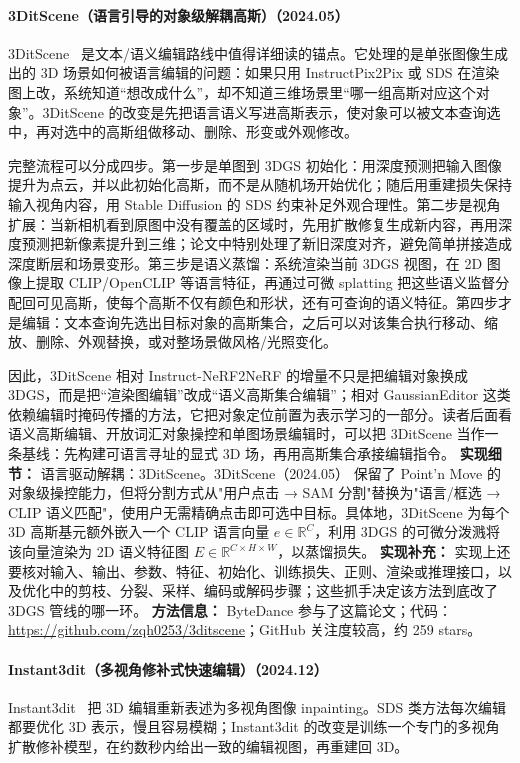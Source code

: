 \paragraph{3DitScene（语言引导的对象级解耦高斯）（2024.05）}
3DitScene~\cite{2405_18424} 是文本/语义编辑路线中值得详细读的锚点。它处理的是单张图像生成出的 3D 场景如何被语言编辑的问题：如果只用 InstructPix2Pix 或 SDS 在渲染图上改，系统知道“想改成什么”，却不知道三维场景里“哪一组高斯对应这个对象”。3DitScene 的改变是先把语言语义写进高斯表示，使对象可以被文本查询选中，再对选中的高斯组做移动、删除、形变或外观修改。

完整流程可以分成四步。第一步是单图到 3DGS 初始化：用深度预测把输入图像提升为点云，并以此初始化高斯，而不是从随机场开始优化；随后用重建损失保持输入视角内容，用 Stable Diffusion 的 SDS 约束补足外观合理性。第二步是视角扩展：当新相机看到原图中没有覆盖的区域时，先用扩散修复生成新内容，再用深度预测把新像素提升到三维；论文中特别处理了新旧深度对齐，避免简单拼接造成深度断层和场景变形。第三步是语义蒸馏：系统渲染当前 3DGS 视图，在 2D 图像上提取 CLIP/OpenCLIP 等语言特征，再通过可微 splatting 把这些语义监督分配回可见高斯，使每个高斯不仅有颜色和形状，还有可查询的语义特征。第四步才是编辑：文本查询先选出目标对象的高斯集合，之后可以对该集合执行移动、缩放、删除、外观替换，或对整场景做风格/光照变化。

因此，3DitScene 相对 Instruct-NeRF2NeRF 的增量不只是把编辑对象换成 3DGS，而是把“渲染图编辑”改成“语义高斯集合编辑”；相对 GaussianEditor 这类依赖编辑时掩码传播的方法，它把对象定位前置为表示学习的一部分。读者后面看语义高斯编辑、开放词汇对象操控和单图场景编辑时，可以把 3DitScene 当作一条基线：先构建可语言寻址的显式 3D 场，再用高斯集合承接编辑指令。
\textbf{实现细节：} 语言驱动解耦：3DitScene。3DitScene（2024.05） 保留了 Point'n Move 的对象级操控能力，但将分割方式从"用户点击 → SAM 分割"替换为"语言/框选 → CLIP 语义匹配"，使用户无需精确点击即可选中目标。具体地，3DitScene 为每个 3D 高斯基元额外嵌入一个 CLIP 语言向量 $e \in \mathbb{R}^C$，利用 3DGS 的可微分泼溅将该向量渲染为 2D 语义特征图 $E \in \mathbb{R}^{C \times H \times W}$，以蒸馏损失。
\textbf{实现补充：} 实现上还要核对输入、输出、参数、特征、初始化、训练损失、正则、渲染或推理接口，以及优化中的剪枝、分裂、采样、编码或解码步骤；这些抓手决定该方法到底改了 3DGS 管线的哪一环。
\textbf{方法信息：} ByteDance 参与了这篇论文；代码：\url{https://github.com/zqh0253/3ditscene}；GitHub 关注度较高，约 259 stars。



\paragraph{Instant3dit（多视角修补式快速编辑）（2024.12）}
Instant3dit~\cite{2412_00518} 把 3D 编辑重新表述为多视角图像 inpainting。SDS 类方法每次编辑都要优化 3D 表示，慢且容易模糊；Instant3dit 的改变是训练一个专门的多视角扩散修补模型，在约数秒内给出一致的编辑视图，再重建回 3D。

